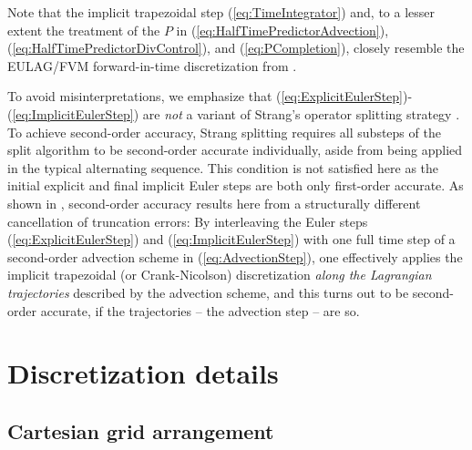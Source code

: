 \documentclass[12pt,a4paper]{article}
\theoremstyle{definition}
\newcommand{\eq}[1]{(\ref{#1})}
\begin{document}
Note that the implicit trapezoidal step \eq{eq:TimeIntegrator} and, to a 
lesser extent the treatment of the $P$ in \eq{eq:HalfTimePredictorAdvection}, 
\eq{eq:HalfTimePredictorDivControl}, and \eq{eq:PCompletion}, closely resemble the EULAG/FVM forward-in-time discretization from 
\cite{SmolarkiewiczMargolin1997,PrusaEtAl2008,SmolarkiewiczEtAl2014,SmolarkiewiczEtAl2016, KuehnleinEtAl2019}. 

To avoid misinterpretations, we emphasize that 
\eq{eq:ExplicitEulerStep}-\eq{eq:ImplicitEulerStep} are \emph{not} a
variant of Strang's operator splitting strategy \cite{Strang1968}. To
achieve second-order accuracy, Strang splitting requires all substeps of 
the split algorithm to be second-order accurate individually, aside from
being applied in the typical alternating sequence. This condition is not 
satisfied here as the initial explicit and final implicit Euler steps are 
both only first-order accurate. As shown in \cite{SmolarkiewiczMargolin1993}, 
second-order accuracy results here from a structurally different cancellation 
of truncation errors: By interleaving the Euler steps \eq{eq:ExplicitEulerStep} 
and \eq{eq:ImplicitEulerStep} with one full time step of a second-order 
advection scheme in \eq{eq:AdvectionStep}, one effectively applies the
implicit trapezoidal (or Crank-Nicolson) discretization 
\emph{along the Lagrangian trajectories} described by the advection scheme, 
and this turns out to be second-order accurate, if the trajectories -- the advection step -- are so. 




\section{Discretization details}
\label{sec:DiscretizationDetails}


\subsection{Cartesian grid arrangement}
\label{ssec:GridArrangement}
\end{document}
